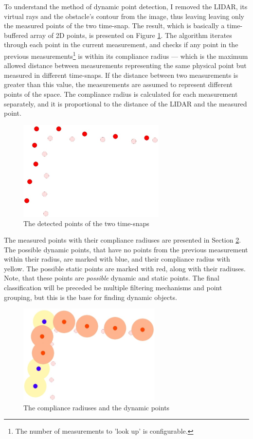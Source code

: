 To understand the method of dynamic point detection, I removed the LIDAR, its virtual rays and the obstacle's contour from the image, thus leaving leaving only the measured points of the two time-snap. The result, which is basically a time-buffered array of 2D points, is presented on Figure \ref{obstacle_movement_lidar_only}. The algorithm iterates through each point in the current measurement, and checks if any point in the previous measurements\footnote{The number of measurements to 'look up' is configurable.} is within its compliance radius --- which is the maximum allowed distance between measurements representing the same physical point but measured in different time-snaps. If the distance between two measurements is greater than this value, the measurements are assumed to represent different points of the space. The compliance radius is calculated for each measurement separately, and it is proportional to the distance of the LIDAR and the measured point.

\begin{figure}[!ht]
    \centering
    \includegraphics[height=50mm]{figures/raw/jpeg/obstacle_movement_lidar_only.jpg}
    \caption{The detected points of the two time-snaps}
    \label{obstacle_movement_lidar_only}
\end{figure}

The measured points with their compliance radiuses are presented in Section \ref{compliance_radiuses}. The possible dynamic points, that have no points from the previous measurement within their radius, are marked with blue, and their compliance radius with yellow. The possible static points are marked with red, along with their radiuses. Note, that these points are \textit{possible} dynamic and static points. The final classification will be preceded be multiple filtering mechanisms and point grouping, but this is the base for finding dynamic objects.

\begin{figure}[!ht]
    \centering
    \includegraphics[height=50mm]{figures/raw/jpeg/compliance_radiuses.jpg}
    \caption{The compliance radiuses and the dynamic points}
    \label{compliance_radiuses}
\end{figure}

